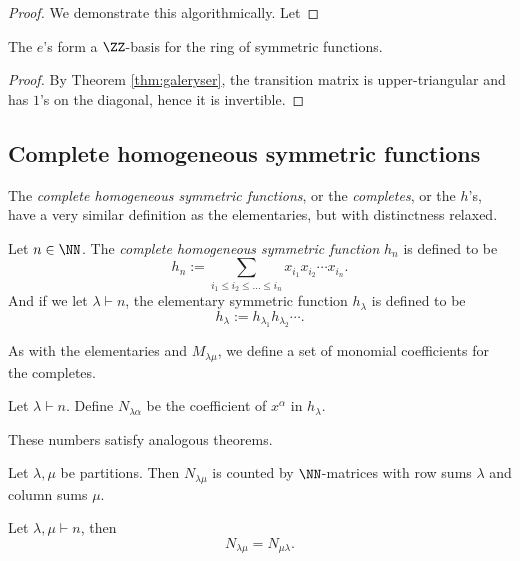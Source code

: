 \documentclass{article}
\begin{document}
\begin{proof}
    We demonstrate this algorithmically. 
    Let
\end{proof}

\begin{theorem} The $e$'s form a $\ZZ$-basis for the ring of symmetric functions.
\end{theorem}

\begin{proof}
    By Theorem \ref{thm:galeryser}, the transition matrix is upper-triangular and has $1$'s on the diagonal, hence it is invertible. 
\end{proof}

\subsection{Complete homogeneous symmetric functions}

The \textit{complete homogeneous symmetric functions}, or the \textit{completes}, or the $h$'s, have a very similar definition as the elementaries, but with distinctness relaxed.

\begin{definition}
    Let $n\in\NN$. The \textit{complete homogeneous symmetric function} $h_n$ is defined to be
    \[
        h_n := \sum_{i_1\leq i_2\leq\ldots\leq i_n} x_{i_1}x_{i_2}\cdots x_{i_n}.
    \]
    And if we let $\lambda \vdash n$, the elementary symmetric function $h_\lambda$ is defined to be
    \[
        h_\lambda := h_{\lambda_1}h_{\lambda_2}\cdots.
    \]
\end{definition}

As with the elementaries and $M_{\lambda\mu}$, we define a set of monomial coefficients for the completes.

\begin{definition}
    Let $\lambda \vdash n$. Define $N_{\lambda\alpha}$ be the coefficient of $x^\alpha$ in $h_\lambda$.
\end{definition}

These numbers satisfy analogous theorems.

\begin{theorem} \label{thm:h2mCombInterpretation}
    Let $\lambda, \mu$ be partitions. Then $N_{\lambda\mu}$ is counted by $\NN$-matrices with row sums $\lambda$ and column sums $\mu$.
\end{theorem}

\begin{theorem} \label{thm:h2mSymmetric}
    Let $\lambda, \mu \vdash n$, then
    \[
        N_{\lambda\mu} = N_{\mu\lambda}.
    \]
\end{theorem}
\end{document}
